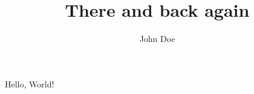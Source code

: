 \documentclass{article}
\title{There and back again}
\author{John Doe}
\begin{document}
\maketitle
\newpage
{}
Hello, World!
\end{document}
